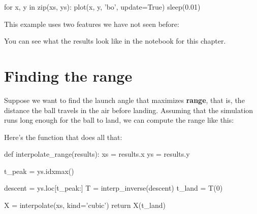 \documentclass[12pt]{book}
\theoremstyle{exercise}
\newcommand{\py}{\verb}%}
\begin{document}
\begin{python}
for x, y in zip(xs, ys):
    plot(x, y, 'bo', update=True)
    sleep(0.01)
\end{python}

This example uses two features we have not seen before:


You can see what the results look like in the notebook for this chapter.


\section{Finding the range}

Suppose we want to find the launch angle that maximizes {\bf range}, that is, the distance the ball travels in the air before landing.  Assuming that the simulation runs long enough for the ball to land, we can compute the range like this:


Here's the function that does all that:

\begin{python}
def interpolate_range(results):
    xs = results.x
    ys = results.y

    t_peak = ys.idxmax()
    
    descent = ys.loc[t_peak:]
    T = interp_inverse(descent)
    t_land = T(0)
    
    X = interpolate(xs, kind='cubic')
    return X(t_land)
\end{python}
\end{document}
